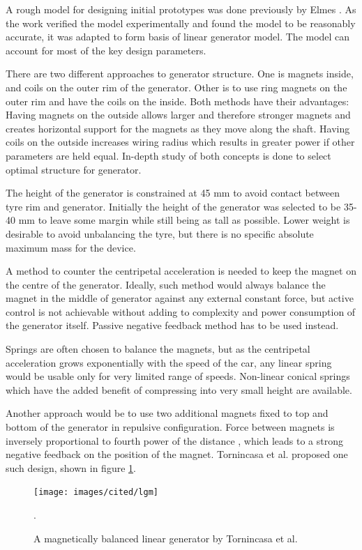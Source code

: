 A rough model for designing initial prototypes was done previously by Elmes \cite{Elmes2005}. As the work verified the model experimentally and found the model to be reasonably accurate, it was adapted to form basis of linear generator model. The model can account for most of the key design parameters. 

There are two different approaches to generator structure. One is magnets inside, and coils on the outer rim of the generator. Other is to use ring magnets on the outer rim and have the coils on the inside. Both methods have their advantages: Having magnets on the outside allows larger and therefore stronger magnets and creates horizontal support for the magnets as they move along the shaft. Having coils on the outside increases wiring radius which results in greater power if other parameters are held equal. In-depth study of both concepts is done to select optimal structure for generator. 

The height of the generator is constrained at 45 mm to avoid contact between tyre rim and generator. Initially the height of the generator was selected to be 35-40 mm to leave some margin while still being as tall as possible. Lower weight is desirable to avoid unbalancing the tyre, but there is no specific absolute maximum mass for the device. 

A method to counter the centripetal acceleration is needed to keep the magnet on the centre of the generator. Ideally, such method would always balance the magnet in the middle of generator against any external constant force, but active control is not achievable without adding to complexity and power consumption of the generator itself. Passive negative feedback method has to be used instead. 

Springs are often chosen to balance the magnets, but as the centripetal acceleration grows exponentially with the speed of the car, any linear spring would be usable only for very limited range of speeds. Non-linear conical springs which have the added benefit of compressing into very small height are available.

Another approach would be to use two additional magnets fixed to top and bottom of the generator in repulsive configuration. Force between magnets is inversely proportional to fourth power of the distance \cite{Amrani2015}, which leads to a strong negative feedback on the position of the magnet. Tornincasa et al. \cite{Tornincasa2012} proposed one such design, shown in figure \ref{lgm}.

\begin{figure}[htb]
\begin{center}
\texttt{[image: images/cited/lgm]}
\end{center}
\caption{A magnetically balanced linear generator by Tornincasa et al. \cite{Tornincasa2012}}.
\label{lgm}
\end{figure}

